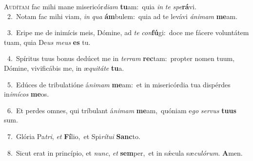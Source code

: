 \lettrine{\initial\textcolor{\initialcolor}{A}}{udítam} fac mihi mane misericór\-\textit{di}\-\textit{am} \textbf{tu}\-am:~\star quia \textit{in} \textit{te} \textit{spe}\-\textbf{rá}vi.\\
{\numbfont\textcolor{\numbcolor}{~2.}}~Notam fac mihi viam, \textit{in} \textit{qua} \textbf{ám}\-bulem:~\star quia ad te levávi \textit{á}\-\textit{ni}\textit{mam} \textbf{me}\-am.\par
{\numbfont\textcolor{\numbcolor}{~3.}}~Eripe me de inimícis meis, Dómine, ad \textit{te} \textit{con}\-\textbf{fú}gi:~\star doce me fácere voluntátem tuam, quia De\textit{us} \textit{me}\-\textit{us} \textbf{es} tu.\par
{\numbfont\textcolor{\numbcolor}{~4.}}~Spíritus tuus bonus dedúcet me in \textit{ter}\-\textit{ram} \textbf{rec}\-tam:~\star propter nomen tuum, Dómine, vivificábis me, in æ\-\textit{qui}\-\textit{tá}\textit{te} \textbf{tu}\-a.\par
{\numbfont\textcolor{\numbcolor}{~5.}}~Edúces de tribulatióne á\-\textit{ni}\-\textit{mam} \textbf{me}\-am:~\star et in misericórdia tua dispérdes in\-\textit{i}\-\textit{mí}\textit{cos} \textbf{me}\-os.\par
{\numbfont\textcolor{\numbcolor}{~6.}}~Et perdes omnes, qui tríbulant á\-\textit{ni}\-\textit{mam} \textbf{me}\-am,~\star quóniam e\textit{go} \textit{ser}\-\textit{vus} \textbf{tu}\-\textbf{us} sum.\par
{\numbfont\textcolor{\numbcolor}{~7.}}~Glória Pa\-\textit{tri}\-, \textit{et} \textbf{Fí}\-lio,~\star et Spi\-\textit{rí}\-\textit{tu}\textit{i} \textbf{Sanc}\-to.\par
{\numbfont\textcolor{\numbcolor}{~8.}}~Sicut erat in princípio, et \textit{nunc}\-, \textit{et} \textbf{sem}\-per,~\star et in sǽcula sæ\-\textit{cu}\-\textit{ló}\textit{rum}. \textbf{A}\-men.\par
